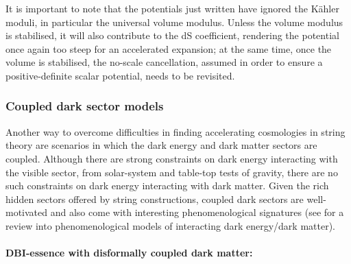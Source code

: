 It is important to note that the potentials just written have ignored the K\"ahler moduli, in particular the universal volume modulus. Unless the volume modulus is stabilised, it will also contribute to the dS coefficient, rendering the potential once again too steep for an accelerated expansion; at the same time, once the volume is stabilised, the no-scale cancellation, assumed in order to ensure a positive-definite scalar potential, needs to be revisited.  

\subsubsection{Coupled dark sector models} 

Another way to overcome difficulties in finding accelerating cosmologies in string theory are scenarios in which the dark energy and dark matter sectors are coupled. Although there are strong constraints on dark energy interacting with the visible sector, from solar-system and table-top tests of gravity, there are no such constraints on dark energy interacting with dark matter. Given the rich hidden sectors offered by string constructions, coupled dark sectors are well-motivated and also come with interesting phenomenological signatures (see \cite{Bolotin:2013jpa, Wang:2016lxa} for a review into phenomenological models of interacting dark energy/dark matter).  

\paragraph{DBI-essence with disformally coupled dark matter:}

